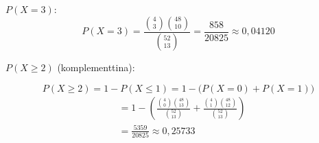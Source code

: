 \documentclass[12pt,a4paper]{article}
\begin{document}
\begin{kohta}
\item $P(X=3)$:
\[
P(X=3)=\frac{\binom{4}{3}\binom{48}{10}}{\binom{52}{13}}
=\frac{858}{20825}\approx 0{,}04120
\]

\item $P(X\ge 2)$ (komplementtina):

\[ P(X \ge 2) = 1 - P(X \le 1) = 1 - \big( P(X=0) + P(X=1) \big) \]
\[ 
\begin{aligned}
&= 1 - \left( \frac{\binom{4}{0}\binom{48}{13}}{\binom{52}{13}} + \frac{\binom{4}{1}\binom{48}{12}}{\binom{52}{13}} \right)\\
&=\frac{5359}{20825}\approx 0{,}25733
\end{aligned}
\]
\end{kohta}
\end{document}
